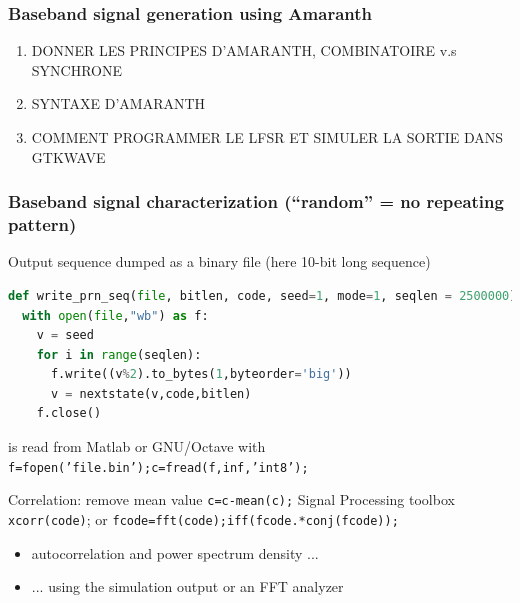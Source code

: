 \documentclass[compress,10pt,aspectratio=169]{beamer}
\begin{document}
\begin{frame}\frametitle{Baseband signal generation using Amaranth}

\begin{enumerate}
\item DONNER LES PRINCIPES D'AMARANTH, COMBINATOIRE v.s SYNCHRONE
\item SYNTAXE D'AMARANTH
\item COMMENT PROGRAMMER LE LFSR ET SIMULER LA SORTIE DANS GTKWAVE
\end{enumerate}
\end{frame}

\begin{frame}\frametitle{Baseband signal characterization (``random'' = no repeating pattern)}

Output sequence dumped as a binary file (here 10-bit long sequence)
\begin{lstlisting}[language=Python]
def write_prn_seq(file, bitlen, code, seed=1, mode=1, seqlen = 2500000):
  with open(file,"wb") as f:
    v = seed
    for i in range(seqlen):
      f.write((v%2).to_bytes(1,byteorder='big'))
      v = nextstate(v,code,bitlen)
    f.close()
\end{lstlisting}

\begin{minipage}[t]{\linewidth}
\begin{minipage}{.54\linewidth}
is read from Matlab or GNU/Octave with {\tt f=fopen('file.bin');c=fread(f,inf,'int8');}
\vspace{0.3cm}

Correlation: remove mean value {\tt c=c-mean(c);}
Signal Processing toolbox {\tt xcorr(code)}; or {\tt fcode=fft(code);iff(fcode.*conj(fcode));}
\begin{itemize}
\item autocorrelation and power spectrum density ...
\item ... using the simulation output or an FFT analyzer
\end{itemize}


\end{minipage}
\end{minipage}
\end{frame}
\end{document}

